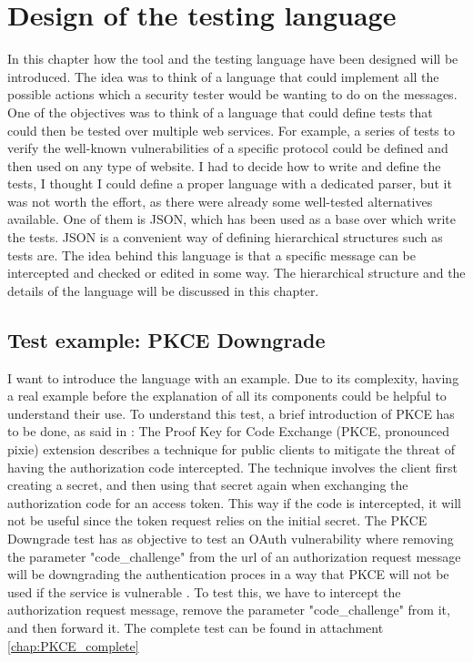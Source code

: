 \chapter{Design of the testing language}
In this chapter how the tool and the testing language have been designed will be introduced. The idea was to think of a language that could implement all the possible actions which a security tester would be wanting to do on the messages. One of the objectives was to think of a language that could define tests that could then be tested over multiple web services. For example, a series of tests to verify the well-known vulnerabilities of a specific protocol could be defined and then used on any type of website.
I had to decide how to write and define the tests, I thought I could define a proper language with a dedicated parser, but it was not worth the effort, as there were already some well-tested alternatives available. One of them is JSON, which has been used as a base over which write the tests. JSON is a convenient way of defining hierarchical structures such as tests are.
The idea behind this language is that a specific message can be intercepted and checked or edited in some way.
The hierarchical structure and the details of the language will be discussed in this chapter.

\section{Test example: PKCE Downgrade}
I want to introduce the language with an example. Due to its complexity, having a real example before the explanation of all its components could be helpful to understand their use.
To understand this test, a brief introduction of PKCE has to be done, as said in \cite{pkce_explanation}: The Proof Key for Code Exchange (PKCE, pronounced pixie) extension describes a technique for public clients to mitigate the threat of having the authorization code intercepted. The technique involves the client first creating a secret, and then using that secret again when exchanging the authorization code for an access token. This way if the code is intercepted, it will not be useful since the token request relies on the initial secret. 
The PKCE Downgrade test has as objective to test an \Gls{OAuth} vulnerability where removing the parameter "code\_challenge" from the url of an authorization request message will be downgrading the authentication proces in a way that PKCE will not be used if the service is vulnerable \cite{pkce_downgrade}. To test this, we have to intercept the authorization request message, remove the parameter "code\_challenge" from it, and then forward it.
The complete test can be found in attachment \ref{chap:PKCE_complete}


